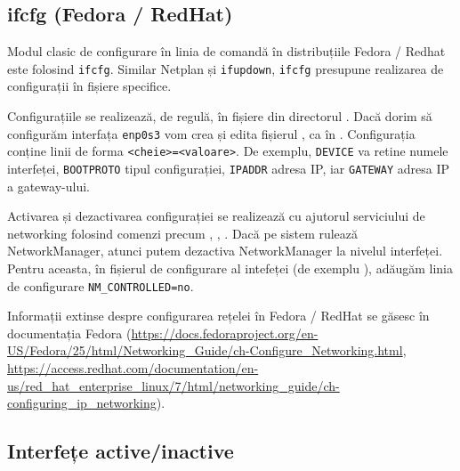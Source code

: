 \subsection{ifcfg (Fedora / RedHat)}
\label{sec:net:linux-config:cli:ifcfg}

Modul clasic de configurare în linia de comandă în distribuțiile Fedora / Redhat este folosind \texttt{ifcfg}.
Similar Netplan și \texttt{ifupdown}, \texttt{ifcfg} presupune realizarea de configurații în fișiere specifice.

Configurațiile se realizează, de regulă, în fișiere din directorul .
Dacă dorim să configurăm interfața \texttt{enp0s3} vom crea și edita fișierul , ca în .
Configurația conține linii de forma \verb|<cheie>=<valoare>|.
De exemplu, \texttt{DEVICE} va retine numele interfeței, \texttt{BOOTPROTO} tipul configurației, \texttt{IPADDR} adresa IP, iar \texttt{GATEWAY} adresa IP a gateway-ului.


Activarea și dezactivarea configurației se realizează cu ajutorul serviciului de networking folosind comenzi precum , , .
Dacă pe sistem rulează NetworkManager, atunci putem dezactiva NetworkManager la nivelul interfeței.
Pentru aceasta, în fișierul de configurare al intefeței (de exemplu ), adăugăm linia de configurare \verb|NM_CONTROLLED=no|.

Informații extinse despre configurarea rețelei în Fedora / RedHat se găsesc în documentația Fedora (\url{https://docs.fedoraproject.org/en-US/Fedora/25/html/Networking\_Guide/ch-Configure\_Networking.html}, \url{https://access.redhat.com/documentation/en-us/red\_hat\_enterprise\_linux/7/html/networking\_guide/ch-configuring\_ip\_networking}).

\subsection{Interfețe active/inactive}
\label{sec:net:linux-config:up-down-if}

